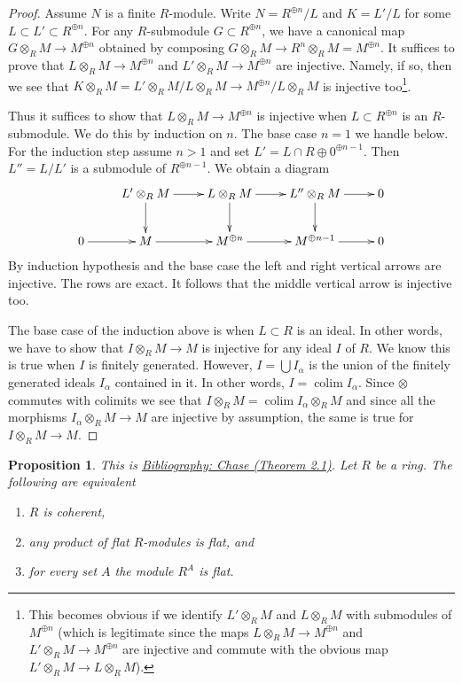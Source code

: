 \documentclass{amsart}
\newenvironment{reference}{\comment}{\endcomment}
\theoremstyle{plain}
\newtheorem{proposition}[subsection]{Proposition}
\theoremstyle{definition}
\theoremstyle{remark}
\numberwithin{equation}{subsection}
\def\colim{\mathop{\mathrm{colim}}\nolimits}
\begin{document}
\begin{proof}
\medskip\noindent
Assume $N$ is a finite $R$-module. Write $N = R^{\oplus n}/L$ and $K = L'/L$
for some $L \subset L' \subset R^{\oplus n}$.
For any $R$-submodule $G \subset R^{\oplus n}$,
we have a canonical map $G \otimes_R M \to M^{\oplus n}$
obtained by composing
$G \otimes_R M \to R^n \otimes_R M = M^{\oplus n}$.
It suffices to prove that $L \otimes_R M \to M^{\oplus n}$
and $L' \otimes_R M \to M^{\oplus n}$ are injective.
Namely, if so, then we see that
$K \otimes_R M = L' \otimes_R M/L \otimes_R M \to M^{\oplus n}/L \otimes_R M$
is injective too\footnote{This becomes obvious if we
identify $L' \otimes_R M$ and $L \otimes_R M$ with
submodules of $M^{\oplus n}$ (which is legitimate since
the maps $L \otimes_R M \to M^{\oplus n}$
and $L' \otimes_R M \to M^{\oplus n}$ are injective and
commute with the obvious map $L' \otimes_R M \to L \otimes_R M$).}.

\medskip\noindent
Thus it suffices to show that $L \otimes_R M \to M^{\oplus n}$
is injective when $L \subset R^{\oplus n}$ is an $R$-submodule.
We do this by induction on $n$. The base case $n = 1$ we handle below.
For the induction step assume $n > 1$ and set
$L' = L \cap R \oplus 0^{\oplus n - 1}$. Then $L'' = L/L'$ is a submodule
of $R^{\oplus n - 1}$. We obtain a diagram
$$
\xymatrix{
&
L' \otimes_R M \ar[r] \ar[d] &
L \otimes_R M \ar[r] \ar[d] &
L'' \otimes_R M \ar[r] \ar[d] &
0 \\
0 \ar[r] &
M \ar[r] &
M^{\oplus n} \ar[r] &
M^{\oplus n - 1} \ar[r] & 0
}
$$
By induction hypothesis and the base case the left and right vertical
arrows are injective. The rows are exact. It follows that the middle vertical
arrow is injective too.

\medskip\noindent
The base case of the induction above is when $L \subset R$ is an ideal.
In other words, we have to show that $I \otimes_R M \to M$ is injective
for any ideal $I$ of $R$. We know this is true when $I$ is finitely
generated. However, $I = \bigcup I_\alpha$ is the union of the
finitely generated ideals $I_\alpha$ contained in it. In other words,
$I = \colim I_\alpha$. Since $\otimes$ commutes with colimits we see that
$I \otimes_R M = \colim I_\alpha \otimes_R M$ and since all
the morphisms $I_\alpha \otimes_R M \to M$ are injective by
assumption, the same is true for $I \otimes_R M \to M$.
\end{proof}


\begin{proposition}
\label{proposition-characterize-coherent}
\begin{reference}
This is \href{https://stacks.math.columbia.edu/bibliography}{Bibliography: Chase (Theorem 2.1)}.
\end{reference}
Let $R$ be a ring. The following are equivalent
\begin{enumerate}
\item $R$ is coherent,
\item any product of flat $R$-modules is flat, and
\item for every set $A$ the module $R^A$ is flat.
\end{enumerate}
\end{proposition}
\end{document}
